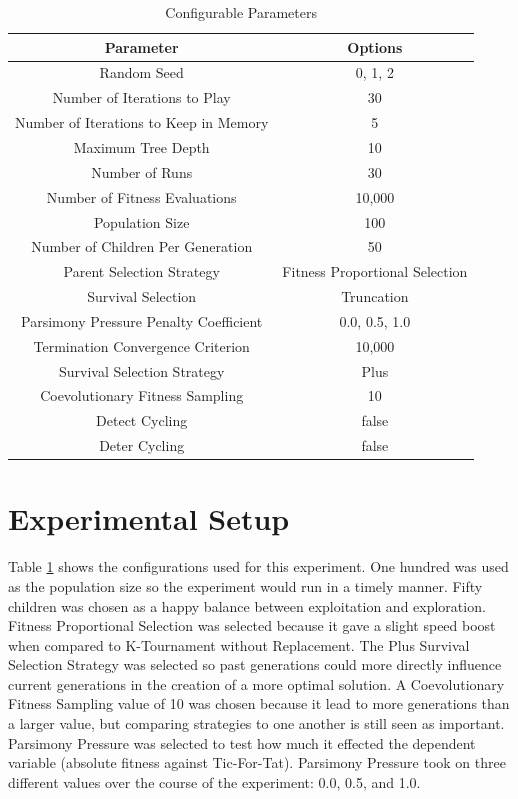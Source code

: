 \documentclass[times]{article}
\begin{document}
	\begin{table}
		\centering
		\caption{Configurable Parameters}
		\label{tab:this_config}
		\begin{tabular}{| c | c |}
			\hline
			\textbf{Parameter} & \textbf{Options} \\
			\hline
			Random Seed & 0, 1, 2 \\
			\hline
			Number of Iterations to Play & 30 \\
			\hline
			Number of Iterations to Keep in Memory & 5 \\
			\hline
			Maximum Tree Depth & 10 \\
			\hline
			Number of Runs & 30 \\
			\hline
			Number of Fitness Evaluations & 10,000 \\
			\hline
			Population Size & 100 \\
			\hline
			Number of Children Per Generation & 50 \\
			\hline
			Parent Selection Strategy 	& Fitness Proportional Selection \\
			\hline
			Survival Selection	& Truncation \\
			\hline
			Parsimony Pressure Penalty Coefficient & 0.0, 0.5, 1.0 \\
			\hline
			Termination Convergence Criterion & 10,000 \\
			\hline
			Survival Selection Strategy 	& Plus \\
			\hline
			Coevolutionary Fitness Sampling	& 10 \\
			\hline
			Detect Cycling & false \\
			\hline
			Deter Cycling & false \\
			\hline
		\end{tabular}
	\end{table}


	\section{Experimental Setup}
	Table \ref{tab:this_config} shows the configurations used for this experiment. One hundred was used as the population size so the experiment would run in a timely manner. Fifty children was chosen as a happy balance between exploitation and exploration. Fitness Proportional Selection was selected because it gave a slight speed boost when compared to K-Tournament without Replacement. The Plus Survival Selection Strategy was selected so past generations could more directly influence current generations in the creation of a more optimal solution. A Coevolutionary Fitness Sampling value of 10 was chosen because it lead to more generations than a larger value, but comparing strategies to one another is still seen as important. Parsimony Pressure was selected to test how much it effected the dependent variable (absolute fitness against Tic-For-Tat). Parsimony Pressure took on three different values over the course of the experiment: 0.0, 0.5, and 1.0.
\end{document}
